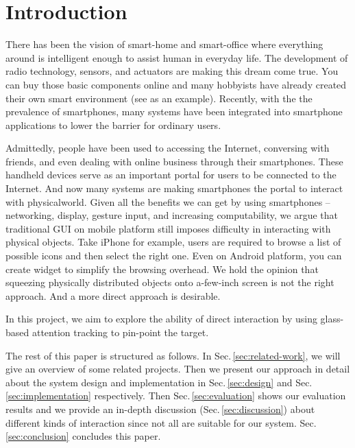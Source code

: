 \section{Introduction}
\label{sec:introduction}

There has been the vision of smart-home and smart-office where everything around is intelligent enough to assist human in everyday life. The development of radio technology, sensors, and actuators are making this dream come true. You can buy those basic components online \cite{SmartHome, NinjaBlocks} and many hobbyists have already created their own smart environment (see \cite{BRAD} as an example). Recently, with the the prevalence of smartphones, many systems \cite{SmartThings, Lockitron} have been integrated into smartphone applications to lower the barrier for ordinary users.

Admittedly, people have been used to accessing the Internet, conversing with friends, and even dealing with online business through their smartphones. These handheld devices serve as an important portal for users to be connected to the Internet. And now many systems are making smartphones the portal to interact with physicalworld. Given all the benefits we can get by using smartphones -- networking,  display, gesture input, and increasing computability,  we argue that traditional GUI on mobile platform still imposes difficulty in interacting with physical objects. Take iPhone for example, users are required to browse a list of possible icons and then select the right one. Even on Android platform, you can create widget to simplify the browsing overhead. We hold the opinion that squeezing physically distributed objects onto a-few-inch screen is not the right approach. And a more direct approach is desirable.

In this project, we aim to explore the ability of direct interaction by using glass-based attention tracking to pin-point the target. 



The rest of this paper is structured as follows. In Sec.\,\ref{sec:related-work}, we will give an overview of some related projects. Then we present our approach in detail about the system design and implementation in Sec.\,\ref{sec:design} and Sec.\,\ref{sec:implementation} respectively. Then Sec.\,\ref{sec:evaluation} shows our evaluation results and we provide an in-depth discussion (Sec.\,\ref{sec:discussion}) about different kinds of interaction since not all are suitable for our system. Sec.\,\ref{sec:conclusion} concludes this paper.


